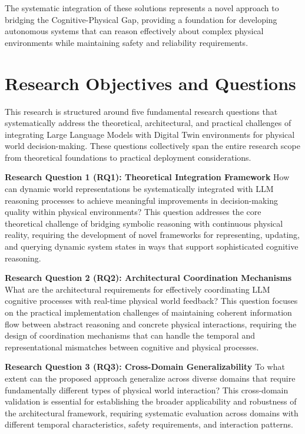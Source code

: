 The systematic integration of these solutions represents a novel approach to bridging the Cognitive-Physical Gap, providing a foundation for developing autonomous systems that can reason effectively about complex physical environments while maintaining safety and reliability requirements.

\section{Research Objectives and Questions}

This research is structured around five fundamental research questions that systematically address the theoretical, architectural, and practical challenges of integrating Large Language Models with Digital Twin environments for physical world decision-making. These questions collectively span the entire research scope from theoretical foundations to practical deployment considerations.

\textbf{Research Question 1 (RQ1): Theoretical Integration Framework}
How can dynamic world representations be systematically integrated with LLM reasoning processes to achieve meaningful improvements in decision-making quality within physical environments? This question addresses the core theoretical challenge of bridging symbolic reasoning with continuous physical reality, requiring the development of novel frameworks for representing, updating, and querying dynamic system states in ways that support sophisticated cognitive reasoning.

\textbf{Research Question 2 (RQ2): Architectural Coordination Mechanisms}
What are the architectural requirements for effectively coordinating LLM cognitive processes with real-time physical world feedback? This question focuses on the practical implementation challenges of maintaining coherent information flow between abstract reasoning and concrete physical interactions, requiring the design of coordination mechanisms that can handle the temporal and representational mismatches between cognitive and physical processes.

\textbf{Research Question 3 (RQ3): Cross-Domain Generalizability}
To what extent can the proposed approach generalize across diverse domains that require fundamentally different types of physical world interaction? This cross-domain validation is essential for establishing the broader applicability and robustness of the architectural framework, requiring systematic evaluation across domains with different temporal characteristics, safety requirements, and interaction patterns.

